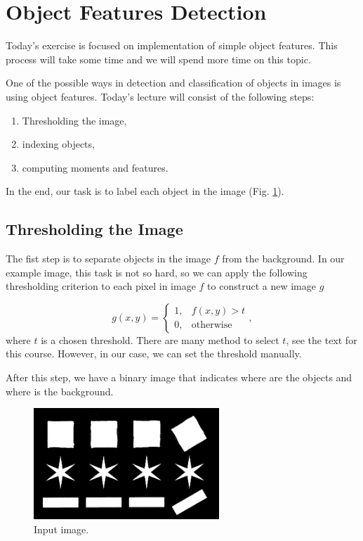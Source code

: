 \documentclass[12pt]{article}
\begin{document}
\section{Object Features Detection}

Today's exercise is focused on implementation of simple object features.
This process will take some time and we will spend more time on this topic.

One of the possible ways in detection and classification of objects in images is using object features.
Today's lecture will consist of the following steps:

\begin{enumerate}
    \item Thresholding the image,
    \item indexing objects,
    \item computing moments and features.
\end{enumerate}

In the end, our task is to label each object in the image (Fig. \ref{fig:input}).

\subsection{Thresholding the Image}
The fist step is to separate objects in the image $f$ from the background. In our example image, this task is not so hard,
so we can apply the following thresholding criterion to each pixel in image $f$ to construct a new image $g$

\begin{equation}
g(x, y) = \left\{
\begin{array}{cc}
1, & f(x, y) > t \\
0, & \mathrm{otherwise}
\end{array}
\right.,
\end{equation}
where $t$ is a chosen threshold. There are many method to select $t$, see the text for this course.
However, in our case, we can set the threshold manually.

After this step, we have a binary image that indicates where are the objects and where is the background.

\begin{figure}[h]
\begin{centering}
\includegraphics{train.png}
\caption{Input image.}
\end{centering}
\label{fig:input}
\end{figure}
\end{document}
